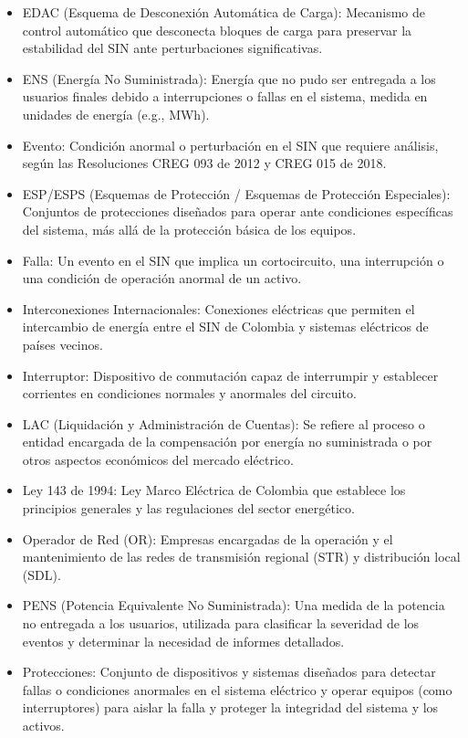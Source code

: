\documentclass[a5paper]{book}%
\begin{document}
{\begin{itemize}
  \item EDAC (Esquema de Desconexión Automática de Carga): Mecanismo de control automático que desconecta bloques de carga para preservar la estabilidad del SIN ante perturbaciones significativas.
  \item ENS (Energía No Suministrada): Energía que no pudo ser entregada a los usuarios finales debido a interrupciones o fallas en el sistema, medida en unidades de energía (e.g., MWh).
  \item Evento: Condición anormal o perturbación en el SIN que requiere análisis, según las Resoluciones CREG 093 de 2012 y CREG 015 de 2018.
  \item ESP/ESPS (Esquemas de Protección / Esquemas de Protección Especiales): Conjuntos de protecciones diseñados para operar ante condiciones específicas del sistema, más allá de la protección básica de los equipos.
  \item Falla: Un evento en el SIN que implica un cortocircuito, una interrupción o una condición de operación anormal de un activo.
  \item Interconexiones Internacionales: Conexiones eléctricas que permiten el intercambio de energía entre el SIN de Colombia y sistemas eléctricos de países vecinos.
  \item Interruptor: Dispositivo de conmutación capaz de interrumpir y establecer corrientes en condiciones normales y anormales del circuito.
  \item LAC (Liquidación y Administración de Cuentas): Se refiere al proceso o entidad encargada de la compensación por energía no suministrada o por otros aspectos económicos del mercado eléctrico.
  \item Ley 143 de 1994: Ley Marco Eléctrica de Colombia que establece los principios generales y las regulaciones del sector energético.
  \item Operador de Red (OR): Empresas encargadas de la operación y el mantenimiento de las redes de transmisión regional (STR) y distribución local (SDL).
  \item PENS (Potencia Equivalente No Suministrada): Una medida de la potencia no entregada a los usuarios, utilizada para clasificar la severidad de los eventos y determinar la necesidad de informes detallados.
  \item Protecciones: Conjunto de dispositivos y sistemas diseñados para detectar fallas o condiciones anormales en el sistema eléctrico y operar equipos (como interruptores) para aislar la falla y proteger la integridad del sistema y los activos.

\end{itemize}}
\end{document}
